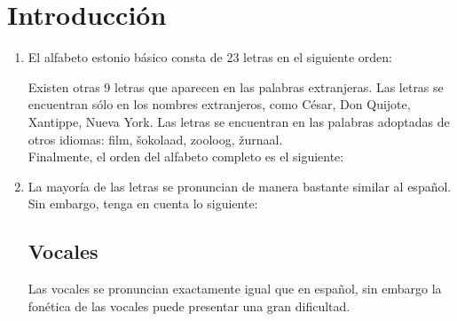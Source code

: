 %
%


\chapter{Introducción} 

\label{introduction} %


\begin{enumerate}
	\item El alfabeto estonio básico consta de 23 letras en el siguiente orden:
	\begin{center}
	\begin{otherlanguage}{estonian}
	\end{otherlanguage}
	\end{center}

	Existen otras 9 letras que aparecen en las palabras extranjeras. Las letras  se encuentran sólo en los nombres extranjeros, como César, Don Quijote, Xantippe, Nueva York. Las letras  se encuentran en las palabras adoptadas de otros idiomas: film, šokolaad, zooloog, žurnaal.\\ 
	Finalmente, el orden del alfabeto completo es el siguiente:
	\begin{center}
	\begin{otherlanguage}{estonian}
	\end{otherlanguage}
	\end{center}

	\item La mayoría de las letras se pronuncian de manera bastante similar al español. Sin embargo, tenga en cuenta lo siguiente:

	\section*{\Large{Vocales}}

	Las vocales  se pronuncian exactamente igual que en español, sin embargo la fonética de las vocales  puede presentar una gran dificultad.\\


\end{enumerate}
